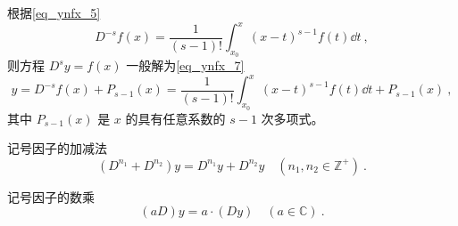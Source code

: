 根据\autoref{eq_ynfx_5}~
\begin{equation}\label{eq_Sign_9}
D^{-s}f(x)=\frac{1}{(s-1)!}\int_{x_0}^x(x-t)^{s-1}f(t)\dd t~,
\end{equation}
则方程 $D^sy=f(x)$ 一般解为\autoref{eq_ynfx_7}~
\begin{equation}
y=D^{-s}f(x)+P_{s-1}(x)=\frac{1}{(s-1)!}\int_{x_0}^x(x-t)^{s-1}f(t)\dd t+P_{s-1}(x)~,
\end{equation}
其中 $P_{s-1}(x)$ 是 $x$ 的具有任意系数的 $s-1$ 次多项式。
\begin{definition}{记号因子的加减法}
\begin{equation}
(D^{n_1}+D^{n_2})y=D^{n_1}y+D^{n_2}y\quad(n_1,n_2\in \mathbb{Z^{+
}})~.
\end{equation}
\end{definition}
\begin{definition}{记号因子的数乘}
\begin{equation}
(aD)y=a\cdot(Dy)\quad(a\in\mathbb{C})~.
\end{equation}
\end{definition}
